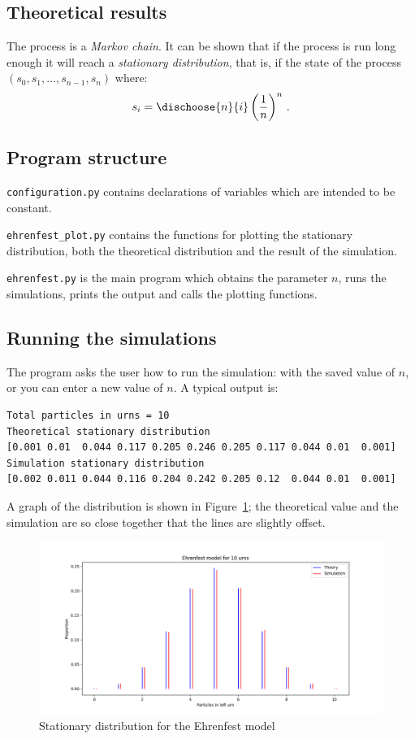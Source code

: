 \subsection{Theoretical results}

The process is a \emph{Markov chain}. It can be shown that if the process is run long enough it will reach a \emph{stationary distribution}, that is, if the state of the process $(s_0,s_1,\ldots,s_{n-1},s_n)$ where:
\[
s_i=\dischoose{n}{i}\left(\frac{1}{n}\right)^n\,.
\]

\subsection{Program structure}

\verb+configuration.py+ contains declarations of variables which are intended to be constant. 

\verb+ehrenfest_plot.py+ contains the functions for plotting the stationary distribution, both the theoretical distribution and the result of the simulation.

\verb+ehrenfest.py+ is the main program which obtains the parameter $n$, runs the simulations, prints the output and calls the plotting functions.

\subsection{Running the simulations}

The program asks the user how to run the simulation: with the saved value of $n$, or you can enter a new value of $n$. A typical output is:
\begin{verbatim}
Total particles in urns = 10
Theoretical stationary distribution
[0.001 0.01  0.044 0.117 0.205 0.246 0.205 0.117 0.044 0.01  0.001]
Simulation stationary distribution
[0.002 0.011 0.044 0.116 0.204 0.242 0.205 0.12  0.044 0.01  0.001]
\end{verbatim}
A graph of the distribution is shown in Figure~\ref{f.ehrenfest1}; the theoretical value and the simulation are so close together that the lines are slightly offset.

\begin{figure}
\begin{center}
\includegraphics[width=\textwidth]{ehrenfest-01}
\caption{Stationary distribution for the Ehrenfest model}\label{f.ehrenfest1}
\end{center}
\end{figure}
